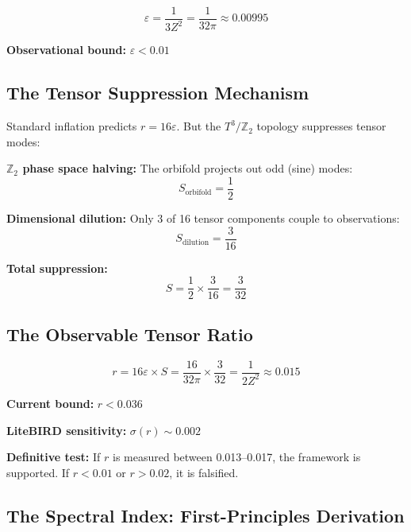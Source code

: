 \documentclass[12pt,a4paper]{article}
\newcommand{\Ztwo}{\mathbb{Z}_2}
\newcommand{\Tthree}{T^3}
\newcommand{\Zsq}{Z^2}
\begin{document}
\begin{equation}
\varepsilon = \frac{1}{3\Zsq} = \frac{1}{32\pi} \approx 0.00995
\end{equation}

\textbf{Observational bound:} $\varepsilon < 0.01$ \checkmark

\subsection{The Tensor Suppression Mechanism}

Standard inflation predicts $r = 16\varepsilon$. But the $\Tthree/\Ztwo$ topology suppresses tensor modes:

\textbf{$\Ztwo$ phase space halving:} The orbifold projects out odd (sine) modes:
\begin{equation}
S_{\text{orbifold}} = \frac{1}{2}
\end{equation}

\textbf{Dimensional dilution:} Only 3 of 16 tensor components couple to observations:
\begin{equation}
S_{\text{dilution}} = \frac{3}{16}
\end{equation}

\textbf{Total suppression:}
\begin{equation}
S = \frac{1}{2} \times \frac{3}{16} = \frac{3}{32}
\end{equation}

\subsection{The Observable Tensor Ratio}

\begin{equation}
\boxed{r = 16\varepsilon \times S = \frac{16}{32\pi} \times \frac{3}{32} = \frac{1}{2\Zsq} \approx 0.015}
\end{equation}

\textbf{Current bound:} $r < 0.036$ \checkmark

\textbf{LiteBIRD sensitivity:} $\sigma(r) \sim 0.002$

\textbf{Definitive test:} If $r$ is measured between 0.013--0.017, the framework is supported. If $r < 0.01$ or $r > 0.02$, it is falsified.

\subsection{The Spectral Index: First-Principles Derivation}
\end{document}
